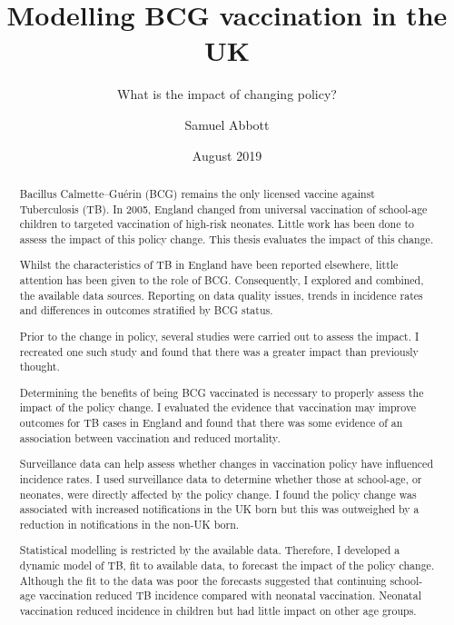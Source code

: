 \documentclass[11pt,twoside]{bristolthesis}
\title{Modelling BCG vaccination in the UK}
\subtitle{What is the impact of changing policy?}
\author{Samuel Abbott}
\date{August 2019}
\begin{document}
  \maketitle

  \frontmatter %

      \begin{abstract}
      Bacillus Calmette--Guérin (BCG) remains the only licensed vaccine against Tuberculosis (TB). In 2005, England changed from universal vaccination of school-age children to targeted vaccination of high-risk neonates. Little work has been done to assess the impact of this policy change. This thesis evaluates the impact of this change.
      
      \par
      
      Whilst the characteristics of TB in England have been reported elsewhere, little attention has been given to the role of BCG. Consequently, I explored and combined, the available data sources. Reporting on data quality issues, trends in incidence rates and differences in outcomes stratified by BCG status.
      
      \par
      
      Prior to the change in policy, several studies were carried out to assess the impact. I recreated one such study and found that there was a greater impact than previously thought.
      
      \par
      
      Determining the benefits of being BCG vaccinated is necessary to properly assess the impact of the policy change. I evaluated the evidence that vaccination may improve outcomes for TB cases in England and found that there was some evidence of an association between vaccination and reduced mortality.
      
      \par
      
      Surveillance data can help assess whether changes in vaccination policy have influenced incidence rates. I used surveillance data to determine whether those at school-age, or neonates, were directly affected by the policy change. I found the policy change was associated with increased notifications in the UK born but this was outweighed by a reduction in notifications in the non-UK born.
      
      \par
      
      Statistical modelling is restricted by the available data. Therefore, I developed a dynamic model of TB, fit to available data, to forecast the impact of the policy change. Although the fit to the data was poor the forecasts suggested that continuing school-age vaccination reduced TB incidence compared with neonatal vaccination. Neonatal vaccination reduced incidence in children but had little impact on other age groups.
      
      \par
    \end{abstract}
\end{document}
